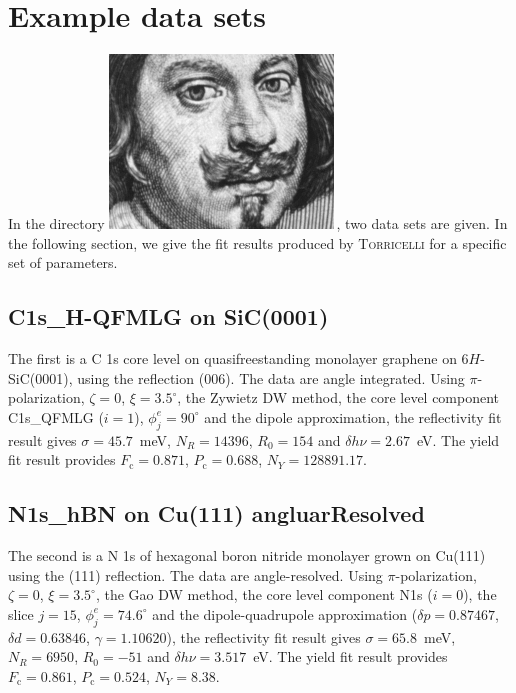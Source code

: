 \documentclass[oldfontcommands,openany,oneside]{memoir}
\newcommand{\dirTorri}[1]{{\fontsize{9}{0}\selectfont\faFolderOpenO\includegraphics{img/Torricelli_icon.png}}$\,${\fontsize{7}{0}\selectfont\faCaretRight}\directory{#1}}
\begin{document}
\chapter{Example data sets} \label{chap:Examples_Files}
In the directory \dirTorri{Examples data sets}, two data sets are given. In the following section, we give the fit results produced by \textsc{Torricelli} for a specific set of parameters.

\section{C1s\_H-QFMLG on SiC(0001)}
The first is a C 1s core level on quasifreestanding monolayer graphene on $6H$-SiC(0001), using the reflection (006). The data are angle integrated. Using $\pi$-polarization, $\zeta=0$, $\xi=3.5^\circ$, the Zywietz DW method, the core level component C1s\_QFMLG ($i=1$), $\phi_j^e=90^\circ$ and the dipole approximation, the reflectivity fit result gives $\sigma=45.7$~meV, $N_R=14396$, $R_0=154$ and $\delta h\nu = 2.67$~eV. The yield fit result provides $F_\mathrm{c}=0.871$, $P_\mathrm{c}=0.688$, $N_Y=128891.17$.

\section{N1s\_hBN on Cu(111) angluarResolved}
The second is a N 1s of hexagonal boron nitride monolayer grown on Cu(111) using the (111) reflection. The data are angle-resolved.  Using $\pi$-polarization, $\zeta=0$, $\xi=3.5^\circ$, the Gao DW method, the core level component N1s ($i=0$), the slice $j=15$, $\phi_j^e=74.6^\circ$ and the dipole-quadrupole approximation ($\delta p= 0.87467$, $\delta d=0.63846$, $\gamma=1.10620$), the reflectivity fit result gives $\sigma=65.8$~meV, $N_R=6950$, $R_0=-51$ and $\delta h\nu = 3.517$~eV. The yield fit result provides $F_\mathrm{c}=0.861$, $P_\mathrm{c}=0.524$, $N_Y=8.38$.
\end{document}
